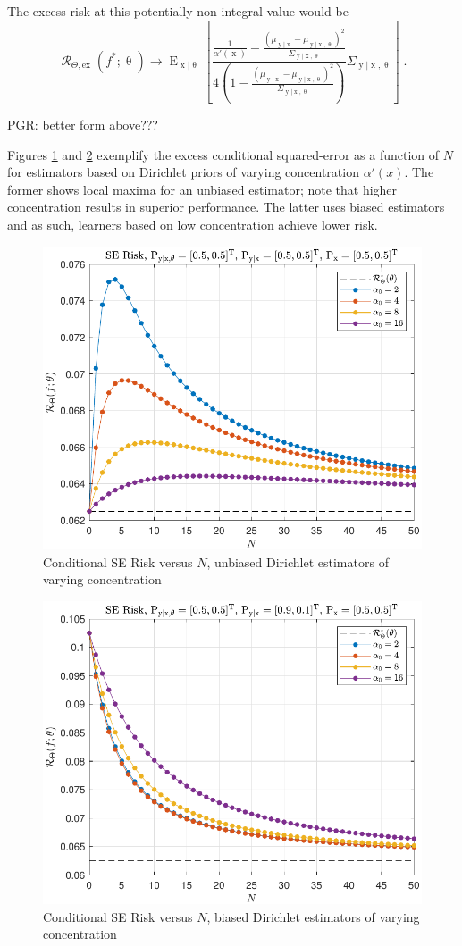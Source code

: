 \documentclass[12pt]{article}
\DeclareMathOperator{\xrm}{\mathrm{x}}
\DeclareMathOperator{\yrm}{\mathrm{y}}
\DeclareMathOperator{\Erm}{\mathrm{E}}
\DeclareMathOperator{\Rcal}{\mathcal{R}}
\begin{document}
The excess risk at this potentially non-integral value would be 
\begin{equation}
\Rcal_{\Theta, \mathrm{ex}}(f^* ; \uptheta) \to \Erm_{\xrm | \uptheta}\left[ \frac{\frac{1}{\alpha'(\xrm)} - \frac{\left( \mu_{\yrm | \xrm} - \mu_{\yrm | \xrm,\uptheta} \right)^2}{\Sigma_{\yrm | \xrm,\uptheta}}}{4\left( 1 - \frac{\left( \mu_{\yrm | \xrm} - \mu_{\yrm | \xrm,\uptheta} \right)^2}{\Sigma_{\yrm | \xrm,\uptheta}} \right)} \Sigma_{\yrm | \xrm,\uptheta} \right] \;.
\end{equation}

PGR: better form above???

Figures \ref{fig:Risk_cond_SE_Dir_N_leg_a0_unbiased} and \ref{fig:Risk_cond_SE_Dir_N_leg_a0_biased} exemplify the excess conditional squared-error as a function of $N$ for estimators based on Dirichlet priors of varying concentration $\alpha'(x)$. The former shows local maxima for an unbiased estimator; note that higher concentration results in superior performance. The latter uses biased estimators and as such, learners based on low concentration achieve lower risk.
\begin{figure}
\centering
\includegraphics[width=0.7\linewidth]{Risk_cond_SE_Dir_N_leg_a0_unbiased.pdf}
\caption{Conditional SE Risk versus $N$, unbiased Dirichlet estimators of varying concentration}
\label{fig:Risk_cond_SE_Dir_N_leg_a0_unbiased}
\end{figure}
\begin{figure}
\centering
\includegraphics[width=0.7\linewidth]{Risk_cond_SE_Dir_N_leg_a0_biased.pdf}
\caption{Conditional SE Risk versus $N$, biased Dirichlet estimators of varying concentration}
\label{fig:Risk_cond_SE_Dir_N_leg_a0_biased}
\end{figure}
\end{document}
